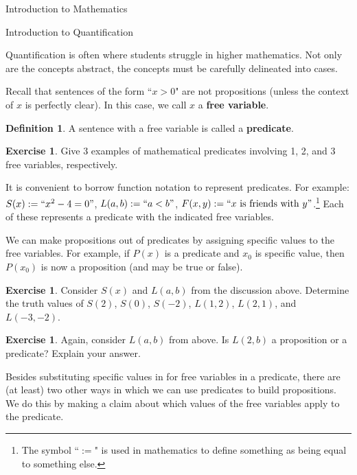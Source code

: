 \documentclass[11pt]{article}
\theoremstyle{definition}
\newtheorem{definition}[theorem]{Definition}
\newtheorem{exercise}[theorem]{Exercise}
\begin{document}
\addtocounter{section}{0}

\begin{section}{Introduction to Mathematics}

\addtocounter{subsection}{3}
\addtocounter{theorem}{54}


\begin{subsection}{Introduction to Quantification}

Quantification is often where students struggle in higher mathematics.  Not only are the concepts abstract, the concepts must be carefully delineated into cases.

Recall that sentences of the form ``$x>0$" are not propositions (unless the context of $x$ is perfectly clear).  In this case, we call $x$ a \textbf{free variable}.

\begin{definition}
A sentence with a free variable is called a \textbf{predicate}.
\end{definition}

\begin{exercise}
Give 3 examples of mathematical predicates involving 1, 2, and 3 free variables, respectively.
\end{exercise}

It is convenient to borrow function notation to represent predicates.  For example: $S(x):=``x^2-4=0"$, $L(a,b):=``a<b"$, $F(x,y):=``x \mbox{ is friends with } y"$.\footnote{The symbol ``$:=$" is used in mathematics to define something as being equal to something else.}  Each of these represents a predicate with the indicated free variables.

We can make propositions out of predicates by assigning specific values to the free variables.  For example, if $P(x)$ is a predicate and $x_0$ is specific value, then $P(x_0)$ is now a proposition (and may be true or false).

\begin{exercise}
Consider $S(x)$ and $L(a,b)$ from the discussion above.  Determine the truth values of $S(2)$, $S(0)$, $S(-2)$, $L(1,2)$, $L(2,1)$, and $L(-3,-2)$.
\end{exercise}

\begin{exercise}
Again, consider $L(a,b)$ from above.  Is $L(2,b)$ a proposition or a predicate?  Explain your answer.
\end{exercise}

Besides substituting specific values in for free variables in a predicate, there are (at least) two other ways in which we can use predicates to build propositions.  We do this by making a claim about which values of the free variables apply to the predicate.


\end{subsection}
\end{section}
\end{document}
